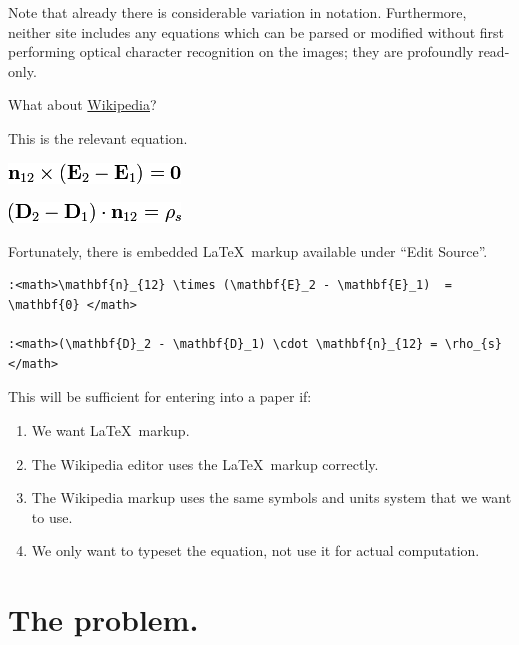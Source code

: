 \documentclass[12pt,letterpaper]{article}
\begin{document}
Note that already there is considerable variation in notation.
Furthermore, neither site includes any equations which can be parsed or modified
without first performing optical character recognition on the images;
they are profoundly read-only.

What about
\href{https://en.wikipedia.org/wiki/Interface_conditions_for_electromagnetic_fields}
{Wikipedia}?

This is the relevant equation.

\begin{center}
\includegraphics[scale=0.5]{wikipedia1.png}

\includegraphics[scale=0.5]{wikipedia2.png}
\end{center}

Fortunately,
there is embedded \LaTeX\ markup available under ``Edit Source''.

\begin{verbatim}
:<math>\mathbf{n}_{12} \times (\mathbf{E}_2 - \mathbf{E}_1)  = \mathbf{0} </math>

:<math>(\mathbf{D}_2 - \mathbf{D}_1) \cdot \mathbf{n}_{12} = \rho_{s} </math>
\end{verbatim}

This will be sufficient for entering into a paper if:
\begin{enumerate}
\item We want \LaTeX\ markup.
\item The Wikipedia editor uses the \LaTeX\ markup correctly.
\item The Wikipedia markup uses the same symbols and units system that we want to use.
\item We only want to typeset the equation, not use it for actual computation.
\end{enumerate}

\section{The problem.}
\end{document}
